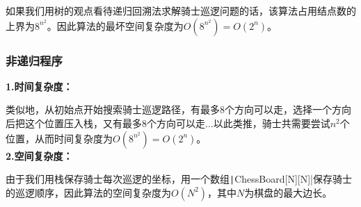 \documentclass[10pt,a4paper]{article}
\begin{document}
	如果我们用树的观点看待递归回溯法求解骑士巡逻问题的话，该算法占用结点数的上界为$8^{n^2}$。因此算法的最坏空间复杂度为$O(8^{n^2})=O(2^n)$。

	\subsubsection{非递归程序}
	\noindent \textbf{1.时间复杂度：}
	
	类似地，从初始点开始搜索骑士巡逻路径，有最多8个方向可以走，选择一个方向后把这个位置压入栈，又有最多8个方向可以走...以此类推，骑士共需要尝试$n^2$个位置，从而时间复杂度为$O(8^{n^2})=O(2^n)$。\\

	\noindent \textbf{2.空间复杂度：}

	由于我们用栈保存骑士每次巡逻的坐标，用一个数组\texttt|ChessBoard[N][N]|保存骑士的巡逻顺序，因此算法的空间复杂度为$O(N^2)$，其中$N$为棋盘的最大边长。
	\newpage
\end{document}
